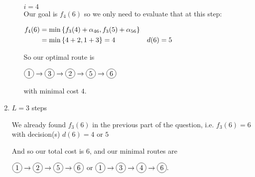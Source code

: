 \begin{prob}
\begin{enumerate}[label = {\textbf{(\greek*)}}]
\begin{sol}
\begin{itemize}
    \item[\underline{$i=4$}] \hspace{0.1cm} \\
    
    Our goal is $f_4(6)$ so we only need to evaluate that at this step:
    
    $\begin{aligned}
    f_4(6)&=\min\left\{f_3(4)+\alpha_{46},f_3(5)+\alpha_{56}\right\} \\
    &=\min\left\{4+2,1+3\right\}=4 & d(6)=5
    \end{aligned}$
    
    So our optimal route is
    
    $\tc{1}\to\tc{3}\to\tc{2}\to\tc{5}\to\tc{6}$
    
    with minimal cost $4$.
    \end{itemize}
    
    \end{sol}
        \item $L = 3$ steps
        
    \begin{sol}
        
        We already found $f_3(6)$ in the previous part of the question, i.e. $f_3(6)=6$ with decision(s) $d(6)=4$ or $5$
        
        And so our total cost is $6$, and our minimal routes are
        
        $\tc{1}\to\tc{2}\to\tc{5}\to\tc{6}$ \quad or \quad
        $\tc{1}\to\tc{3}\to\tc{4}\to\tc{6}.$
        \end{sol}
    \end{enumerate}
\end{prob}

